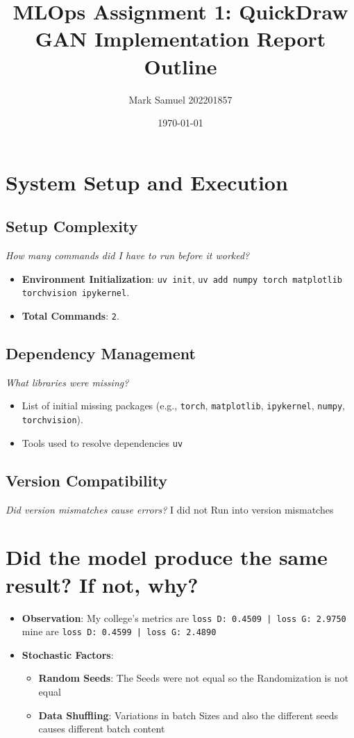 \documentclass{article}
\title{MLOps Assignment 1: QuickDraw GAN Implementation Report Outline}
\author{Mark Samuel 202201857}
\date{\today}
\begin{document}
\maketitle

\section{System Setup and Execution}

\subsection{Setup Complexity}
\textit{How many commands did I have to run before it worked?}
\begin{itemize}
    \item \textbf{Environment Initialization}: \texttt{uv init},  \texttt{uv add numpy torch matplotlib torchvision ipykernel}.
    \item \textbf{Total Commands}: \texttt{2}.
\end{itemize}
\subsection{Dependency Management}
\textit{What libraries were missing?}
\begin{itemize}
    \item List of initial missing packages (e.g., \texttt{torch}, \texttt{matplotlib}, \texttt{ipykernel}, \texttt{numpy}, \texttt{torchvision}).
    \item Tools used to resolve dependencies \texttt{uv}
\end{itemize}

\subsection{Version Compatibility}
\textit{Did version mismatches cause errors?}
I did not Run into version mismatches

\section{Did the model produce the same result? If not, why?}
\begin{itemize}
    \item \textbf{Observation}: My college's metrics are \texttt{loss D: 0.4509 | loss G: 2.9750} \\ mine are \texttt{loss D: 0.4599 | loss G: 2.4890}
    \item \textbf{Stochastic Factors}:
    \begin{itemize}
        \item \textbf{Random Seeds}: The Seeds were not equal so the Randomization is not equal
        \item \textbf{Data Shuffling}: Variations in batch Sizes and also the different seeds causes different batch content 
    \end{itemize}
\end{itemize}
\end{document}
